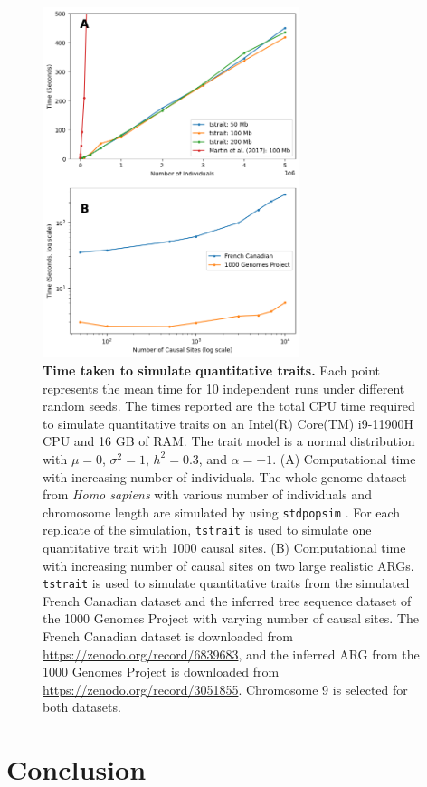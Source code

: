 \documentclass[unnumsec,webpdf,modern,large,namedate]{oup-authoring-template}%
\theoremstyle{thmstyleone}%
\theoremstyle{thmstyletwo}%
\theoremstyle{thmstylethree}%
\begin{document}
\begin{figure}[!t]%
\centering
\includegraphics[width=213pt]{figure.png}
\caption{\textbf{Time taken to simulate quantitative traits.} Each point represents the mean time for 10 independent runs under different random seeds. The times reported are the total CPU time required to simulate quantitative traits on an Intel(R) Core(TM) i9-11900H CPU and 16 GB of RAM.
The trait model is a normal distribution with $\mu=0$, $\sigma^2=1$, $h^2=0.3$, and $\alpha=-1$. (A) Computational time with increasing number of individuals. The whole genome dataset from \emph{Homo sapiens} with various number of individuals and chromosome length are simulated by using \texttt{stdpopsim} \citep{adrion2020}. For each replicate of the simulation, \texttt{tstrait} is used to simulate one quantitative trait with 1000 causal sites. (B) Computational time with increasing number of causal sites on two large realistic ARGs. \texttt{tstrait} is used to simulate quantitative traits from the simulated French Canadian dataset \citep{anderson2023} and the inferred tree sequence dataset of the 1000 Genomes Project \citep{kelleher2019} with varying number of causal sites. The French Canadian dataset is downloaded from \url{https://zenodo.org/record/6839683}, and the inferred ARG from the 1000 Genomes Project is downloaded from \url{https://zenodo.org/record/3051855}. Chromosome 9 is selected for both datasets.}\label{fig:time}
\end{figure}

\section{Conclusion}
\end{document}
